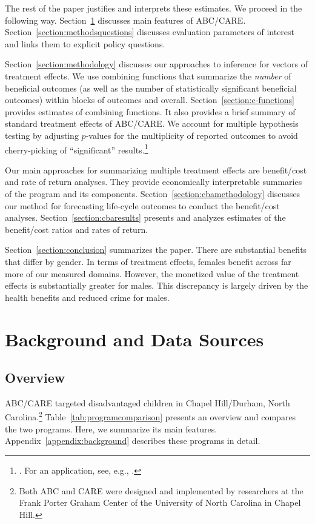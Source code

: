 The rest of the paper justifies and interprets these estimates. We proceed in the following way. Section~\ref{section:background} discusses main features of ABC/CARE. Section~\ref{section:methodsquestions} discusses evaluation parameters of interest and links them to explicit policy questions.

Section~\ref{section:methodology} discusses our approaches to inference for vectors of treatment effects. We use  combining functions that summarize the \emph{number} of beneficial outcomes (as well as the number of statistically significant beneficial outcomes) within blocks of outcomes and overall. Section~\ref{section:c-functions} provides estimates of combining functions. It also provides a brief summary of standard treatment effects of ABC/CARE. We account for multiple hypothesis testing by adjusting $p$-values for the multiplicity of reported outcomes to avoid cherry-picking of ``significant'' results.\footnote{\cite{Romano_Wolf_2005_JASA}. For an application, see, e.g., \cite{Heckman_Moon_etal_2010_QE}.}

Our main approaches for summarizing multiple treatment effects are benefit/cost and rate of return analyses. They provide economically interpretable summaries of the program and its components. Section~\ref{section:cbamethodology} discusses our method for forecasting life-cycle outcomes to conduct the benefit/cost analyses. Section~\ref{section:cbaresults} presents and analyzes estimates of the benefit/cost ratios and rates of return.

Section~\ref{section:conclusion} summarizes the paper. There are substantial benefits that differ by gender. In terms of treatment effects, females benefit across far more of our measured domains. However, the monetized value of the treatment effects is substantially greater for males. This discrepancy is largely driven by the health benefits and reduced crime for males.

\section[Background and Data Sources]{Background and Data Sources} \label{section:background}

\subsection{Overview}

ABC/CARE targeted disadvantaged children in Chapel Hill/Durham, North Carolina.\footnote{Both ABC and CARE were designed and implemented by researchers at the Frank Porter Graham Center of the University of North Carolina in Chapel Hill.} Table~\ref{tab:programcomparison} presents an overview and compares the two programs. Here, we summarize its main features. Appendix~\ref{appendix:background} describes these programs in detail.

